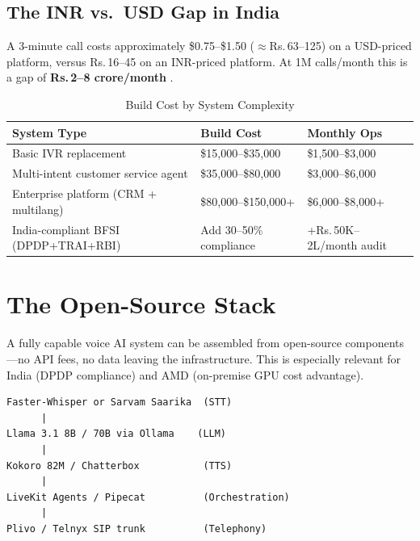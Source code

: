 \documentclass[12pt,a4paper]{article}
\begin{document}
\subsection{The INR vs.\ USD Gap in India}

A 3-minute call costs approximately \$0.75--\$1.50 ($\approx$Rs.\,63--125)
on a USD-priced platform, versus Rs.\,16--45 on an INR-priced platform.  At
1M calls/month this is a gap of \textbf{Rs.\,2--8 crore/month}
\cite{callerdigital-guide}.

\begin{table}[H]\centering
\caption{Build Cost by System Complexity}
\label{tab:build-cost}
\small
\begin{tabularx}{\textwidth}{L{4.2cm}L{2.8cm}X}
\toprule
\textbf{System Type} & \textbf{Build Cost} & \textbf{Monthly Ops} \\
\midrule
Basic IVR replacement                       & \$15{,}000--\$35{,}000  & \$1{,}500--\$3{,}000 \\
Multi-intent customer service agent         & \$35{,}000--\$80{,}000  & \$3{,}000--\$6{,}000 \\
Enterprise platform (CRM + multilang)       & \$80{,}000--\$150{,}000+& \$6{,}000--\$8{,}000+ \\
India-compliant BFSI (DPDP+TRAI+RBI)        & Add 30--50\% compliance & +Rs.\,50K--2L/month audit \\
\bottomrule
\end{tabularx}
\end{table}

\section{The Open-Source Stack}
\label{sec:opensource}

A fully capable voice AI system can be assembled from open-source
components---no API fees, no data leaving the infrastructure.  This is
especially relevant for India (DPDP compliance) and AMD (on-premise GPU
cost advantage).

\begin{lstlisting}[caption={Canonical Open-Source Pipeline (2026)},label=lst:oss]
Faster-Whisper or Sarvam Saarika  (STT)
      |
Llama 3.1 8B / 70B via Ollama    (LLM)
      |
Kokoro 82M / Chatterbox           (TTS)
      |
LiveKit Agents / Pipecat          (Orchestration)
      |
Plivo / Telnyx SIP trunk          (Telephony)
\end{lstlisting}
\end{document}
